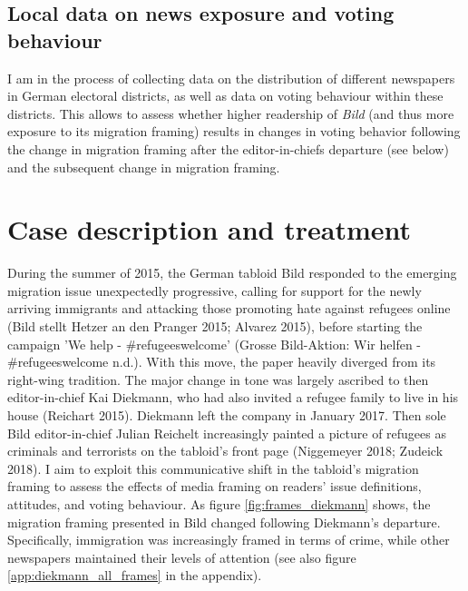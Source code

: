 \documentclass{article}
\begin{document}
\subsection{Local data on news exposure and voting behaviour}

I am in the process of collecting data on the distribution of different newspapers in German electoral districts, as well as data on voting behaviour within these districts. This allows to assess whether higher readership of \textit{Bild} (and thus more exposure to its migration framing) results in changes in voting behavior following the change in migration framing after the editor-in-chiefs departure (see below) and the subsequent change in migration framing. 

\section{Case description and treatment}

During the summer of 2015, the German tabloid Bild responded to the emerging migration issue unexpectedly progressive, calling for support for the newly arriving immigrants and attacking those promoting hate against refugees online (Bild stellt Hetzer an den Pranger 2015; Alvarez 2015), before starting the campaign ’We help - \#refugeeswelcome’ (Grosse Bild-Aktion: Wir helfen - \#refugeeswelcome n.d.). With this move, the paper heavily diverged from its right-wing tradition. The major change in tone was largely ascribed to then editor-in-chief Kai Diekmann, who had also invited a refugee family to live in his house (Reichart 2015). Diekmann left the company in January 2017. Then sole Bild editor-in-chief Julian Reichelt increasingly painted a picture of refugees as criminals and terrorists on the tabloid's front page (Niggemeyer 2018; Zudeick 2018). I aim to exploit this communicative shift in the tabloid’s migration framing to assess the effects of media framing on readers’ issue deﬁnitions, attitudes, and voting behaviour. As figure \ref{fig:frames_diekmann} shows, the migration framing presented in Bild changed following Diekmann's departure. Specifically, immigration was increasingly framed in terms of crime, while other newspapers maintained their levels of attention (see also figure \ref{app:diekmann_all_frames} in the appendix).
\end{document}
